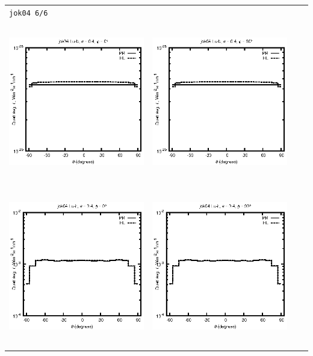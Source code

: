 \documentclass[10pt,a4paper]{article}
\begin{document}
\begin{adjustwidth}{-1.2in}{-1.2in}
\begin{tabular}{c c c c}
\multicolumn{4}{l}{\texttt{jok04 6/6}} \\
\includegraphics[height=7cm]{../eps/jok04_Lu_b_fwd.eps} &
\includegraphics[height=7cm]{../eps/jok04_Lu_b_cross.eps} \\
\includegraphics[height=7cm]{../eps/jok04_Lu_it_fwd.eps} &
\includegraphics[height=7cm]{../eps/jok04_Lu_it_cross.eps} \\

\end{tabular}
\end{adjustwidth}
\end{document}
